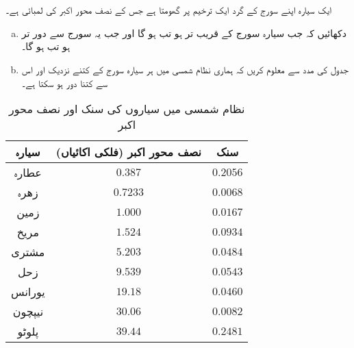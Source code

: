 \\
\\
ایک سیارہ اپنے سورج کے گرد ایک ترخیم پر گھومتا ہے جس کے نصف محور اکبر کی لمبائی  ہے۔
\begin{enumerate}[a.]
\item
دکھائیں کہ جب سیارہ سورج کے قریب تر ہو تب  ہو گا اور جب یہ سورج سے دور تر ہو تب  ہو گا۔
\item
جدول  کی مدد سے معلوم کریں کہ ہماری نظام شمسی میں ہر سیارہ سورج کے کتنے نزدیک اور اس سے کتنا دور ہو سکتا ہے۔
\end{enumerate}
\begin{table}
\caption{نظام شمسی میں سیاروں کی سنک اور نصف محور اکبر}
\label{جدول_مخروط_نظام_شمسی}
\centering
\begin{tabular}{ccc}
\toprule
سیارہ& نصف محور اکبر (فلکی اکائیاں) & سنک\\
\midrule
عطارہ&$0.387$& $0.2056$\\
زھرہ&$0.7233$  & $0.0068$\\
زمین& $1.000$  &  $0.0167$\\
مریخ&  $1.524$  &  $0.0934$  \\
مشتری&  $5.203$   &  $0.0484$\\
زحل&  $9.539$  &  $0.0543$\\
یورانس&  $19.18$  &  $0.0460$\\
نیپچون&  $30.06$  &  $0.0082$\\
پلوٹو&  $39.44$   &  $0.2481$\\
\bottomrule
\end{tabular}
\end{table}

